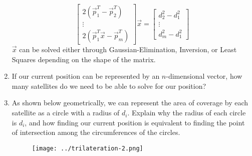 \begin{enumerate}
{        \[
            \begin{bmatrix} 
            2 (\vec{p}_{1}^{T} - \vec{p}_{2}^{T}) \\
            \vdots \\
            2 (\vec{p}_{1}^{T} \vec{x} - \vec{p}_{m}^{T})
            \end{bmatrix} \vec{x} = 
            \begin{bmatrix} 
            d_{2}^{2} - d_{1}^{2} \\
            \vdots \\
            d_{m}^{2} - d_{1}^{2}
            \end{bmatrix}
        \]
        $\vec{x}$ can be solved either through Gaussian-Elimination, Inversion, or Least Squares depending on the shape of the matrix.
    }

    \item If our current position can be represented by an $n$-dimensional vector, how many satellites do we need to be able to solve for our position?

    \answerbox{1cm}

    \item As shown below geometrically, we can represent the area of coverage by each satellite as a circle with a radius of $d_i$. Explain why the radius of each circle is $d_i$, and how finding our current position is equivalent to finding the point of intersection among the circumferences of the circles.
    \begin{figure}[H]
        \centering
        \texttt{[image: ../trilateration-2.png]}
    \end{figure}

    \answerbox{4cm}



\end{enumerate}

